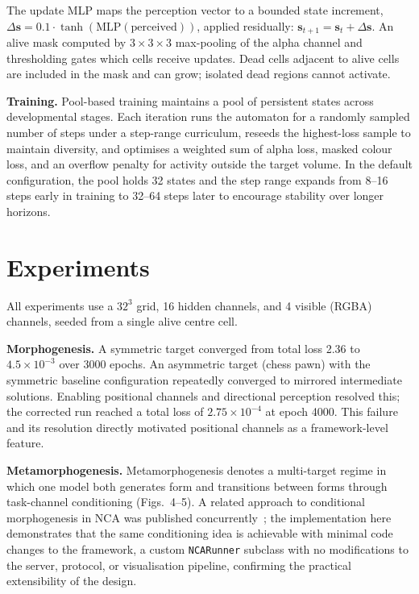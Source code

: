 \documentclass{ExcelAtFIT}
\begin{document}
The update MLP maps the perception vector to a bounded state increment,
$\Delta \mathbf{s} = 0.1 \cdot \tanh(\mathrm{MLP}(\mathrm{perceived}))$,
applied residually: $\mathbf{s}_{t+1} = \mathbf{s}_t + \Delta \mathbf{s}$.
An alive mask computed by $3\times3\times3$ max-pooling of the alpha channel and
thresholding gates which cells receive updates. Dead cells adjacent to alive cells
are included in the mask and can grow; isolated dead regions cannot activate.

\textbf{Training.}
Pool-based training maintains a pool of persistent states across developmental stages.
Each iteration runs the automaton for a randomly sampled number of steps under a step-range curriculum,
reseeds the highest-loss sample to maintain diversity, and optimises a weighted sum of alpha loss,
masked colour loss, and an overflow penalty for activity outside the target volume.
In the default configuration, the pool holds 32 states and the step range expands from 8--16 steps early in training
to 32--64 steps later to encourage stability over longer horizons.

\section{Experiments}

All experiments use a $32^3$ grid, 16 hidden channels, and 4 visible (RGBA) channels,
seeded from a single alive centre cell.

\textbf{Morphogenesis.}
A symmetric target converged from total loss 2.36 to $4.5 \times 10^{-3}$ over
3000 epochs. An asymmetric target (chess pawn) with the symmetric baseline
configuration repeatedly converged to mirrored intermediate solutions. Enabling
positional channels and directional perception resolved this; the corrected run
reached a total loss of $2.75 \times 10^{-4}$ at epoch 4000. This failure and its
resolution directly motivated positional channels as a framework-level feature.

\textbf{Metamorphogenesis.}
Metamorphogenesis denotes a multi-target regime in which one model both generates form and transitions
between forms through task-channel conditioning (Figs.~4--5). A related approach to conditional morphogenesis
in NCA was published
concurrently~\cite{Sakour2025}; the implementation here demonstrates that the same
conditioning idea is achievable with minimal code changes to the framework, a custom
\texttt{NCARunner} subclass with no modifications to the server, protocol, or
visualisation pipeline, confirming the practical extensibility of the design.
\end{document}
